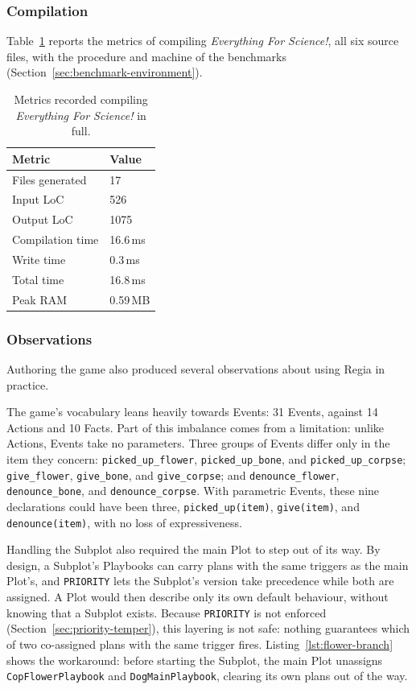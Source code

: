 \subsubsection{Compilation}
\label{sec:test-compilation}

Table~\ref{tab:test-compilation} reports the metrics of compiling \emph{Everything For Science!}, all six source files, with the procedure and machine of the benchmarks (Section~\ref{sec:benchmark-environment}).

\begin{table}[ht]
\centering
\begin{tabular}{|l|l|}
\hline
\textbf{Metric} & \textbf{Value} \\
\hline
Files generated & 17 \\
Input LoC & 526 \\
Output LoC & 1075 \\
Compilation time & 16.6\,ms \\
Write time & 0.3\,ms \\
Total time & 16.8\,ms \\
Peak RAM & 0.59\,MB \\
\hline
\end{tabular}
\caption{Metrics recorded compiling \emph{Everything For Science!} in full.}
\label{tab:test-compilation}
\end{table}

\subsubsection{Observations}
\label{sec:test-observations}

Authoring the game also produced several observations about using Regia in practice.

The game's vocabulary leans heavily towards Events: 31 Events, against 14 Actions and 10 Facts. Part of this imbalance comes from a limitation: unlike Actions, Events take no parameters. Three groups of Events differ only in the item they concern: \lstinline|picked_up_flower|, \lstinline|picked_up_bone|, and \lstinline|picked_up_corpse|; \lstinline|give_flower|, \lstinline|give_bone|, and \lstinline|give_corpse|; and \lstinline|denounce_flower|, \lstinline|denounce_bone|, and \lstinline|denounce_corpse|. With parametric Events, these nine declarations could have been three, \lstinline|picked_up(item)|, \lstinline|give(item)|, and \lstinline|denounce(item)|, with no loss of expressiveness.

Handling the Subplot also required the main Plot to step out of its way. By design, a Subplot's Playbooks can carry plans with the same triggers as the main Plot's, and \lstinline|PRIORITY| lets the Subplot's version take precedence while both are assigned. A Plot would then describe only its own default behaviour, without knowing that a Subplot exists. Because \lstinline|PRIORITY| is not enforced (Section~\ref{sec:priority-temper}), this layering is not safe: nothing guarantees which of two co-assigned plans with the same trigger fires. Listing~\ref{lst:flower-branch} shows the workaround: before starting the Subplot, the main Plot unassigns \lstinline|CopFlowerPlaybook| and \lstinline|DogMainPlaybook|, clearing its own plans out of the way.

